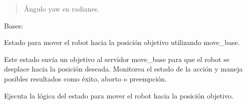 \documentclass[a4paper,10pt,spanish]{sphinxmanual}
\begin{document}
\begin{fulllineitems}
\begin{fulllineitems}
\begin{quote}
\begin{description}
\sphinxAtStartPar
Ángulo yaw en radianes.

\sphinxAtStartPar
{}

\end{description}\end{quote}

\end{fulllineitems}


\end{fulllineitems}


\begin{fulllineitems}
\label{\detokenize{squad_approach_control_action:squad_approach_control_action.MoveToPositionState}}
\pysigstartsignatures
{}
\pysigstopsignatures
\sphinxAtStartPar
Bases: 

\sphinxAtStartPar
Estado para mover el robot hacia la posición objetivo utilizando move\_base.

\sphinxAtStartPar
Este estado envía un objetivo al servidor move\_base para que el robot se desplace
hacia la posición deseada. Monitorea el estado de la acción y maneja posibles
resultados como éxito, aborto o preempción.

\begin{fulllineitems}
\label{\detokenize{squad_approach_control_action:squad_approach_control_action.MoveToPositionState.execute}}
\pysigstartsignatures
{}
\pysigstopsignatures
\sphinxAtStartPar
Ejecuta la lógica del estado para mover el robot hacia la posición objetivo.


\end{fulllineitems}
\end{fulllineitems}
\end{document}
